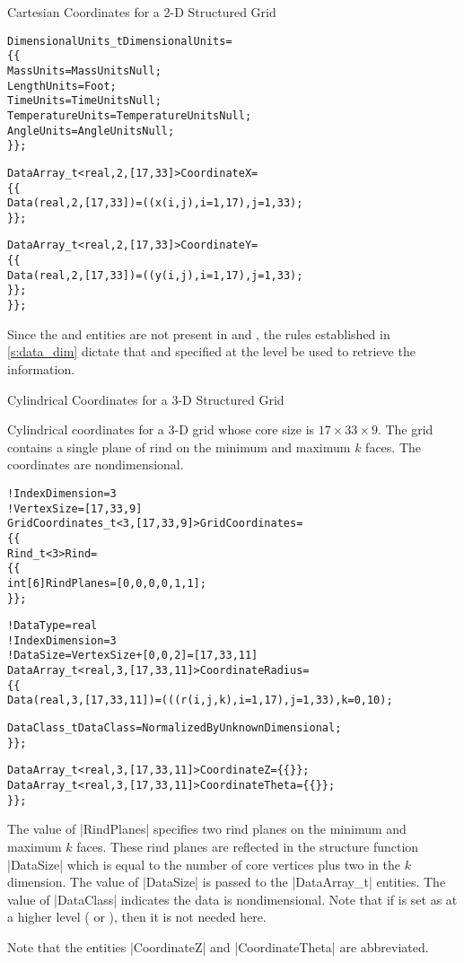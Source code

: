 \begin{example}{Cartesian Coordinates for a 2-D Structured Grid}
\begin{alltt}
    DimensionalUnits\_t DimensionalUnits = 
      \{\{ 
      MassUnits        = MassUnitsNull ;
      LengthUnits      = Foot ;
      TimeUnits        = TimeUnitsNull ;
      TemperatureUnits = TemperatureUnitsNull ;
      AngleUnits       = AngleUnitsNull ;
      \}\} ;

    DataArray\_t<real, 2, [17,33]> CoordinateX =
      \{\{
      Data(real, 2, [17,33]) = ((x(i,j), i=1,17), j=1,33) ;
      \}\} ;

    DataArray\_t<real, 2, [17,33]> CoordinateY =
      \{\{
      Data(real, 2, [17,33]) = ((y(i,j), i=1,17), j=1,33) ;
      \}\} ;
    \}\} ;
\end{alltt}
Since the  and  entities are not
present in  and , the rules
established in \autoref{s:data_dim} dictate that 
and  specified at the 
level be used to retrieve the information.
\end{example}

\newpage
\begin{example}{Cylindrical Coordinates for a 3-D Structured Grid}
\label{ex:grid2}

Cylindrical coordinates for a 3-D grid whose core size is
$17\times33\times9$.
The grid contains a single plane of rind on the minimum and maximum $k$
faces.
The coordinates are nondimensional.
\begin{alltt}
  !  IndexDimension = 3
  !  VertexSize = [17,33,9]
  GridCoordinates\_t<3, [17,33,9]> GridCoordinates =
    \{\{
    Rind\_t<3> Rind =
      \{\{
      int[6] RindPlanes = [0,0,0,0,1,1] ;
      \}\} ;

    ! DataType = real
    ! IndexDimension = 3
    ! DataSize = VertexSize + [0,0,2] = [17,33,11]
    DataArray\_t<real, 3, [17,33,11]> CoordinateRadius =
      \{\{
      Data(real, 3, [17,33,11]) = (((r(i,j,k), i=1,17), j=1,33), k=0,10) ;

      DataClass\_t DataClass = NormalizedByUnknownDimensional ;
      \}\} ;

    DataArray\_t<real, 3, [17,33,11]> CoordinateZ     = \{\{ \}\} ;
    DataArray\_t<real, 3, [17,33,11]> CoordinateTheta = \{\{ \}\} ;
    \}\} ;
\end{alltt}
The value of |RindPlanes| specifies two rind planes on the minimum and
maximum $k$ faces.
These rind planes are reflected in the structure function |DataSize|
which is equal to the number of core vertices plus two in the  $k$ dimension.
The value of |DataSize| is passed to the |DataArray_t| entities.
The value of |DataClass| indicates the data is nondimensional.
Note that if  is set as 
at a  higher level ( or ), then it is not
needed here.

Note that the entities |CoordinateZ| and |CoordinateTheta| are abbreviated.
\end{example}

